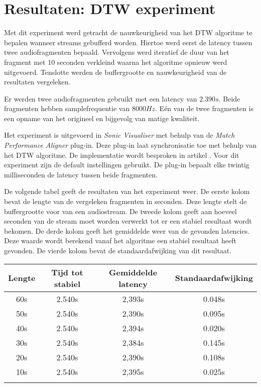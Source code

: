 \chapter{Resultaten: DTW experiment}
\label{appendix-a}

Met dit experiment werd getracht de nauwkeurigheid van het DTW algoritme te bepalen wanneer streams gebufferd worden. Hiertoe werd eerst de latency tussen twee audiofragmenten bepaald. Vervolgens werd iteratief de duur van het fragment met 10 seconden verkleind waarna het algoritme opnieuw werd uitgevoerd. Tenslotte werden de buffergrootte en nauwkeurigheid van de resultaten vergeleken.

Er werden twee audiofragmenten gebruikt met een latency van $2.390s$. Beide fragmenten hebben samplefrequentie van $8000Hz$. Eén van de twee fragmenten is een opname van het origineel en bijgevolg van matige kwaliteit.

Het experiment is uitgevoerd in \textit{Sonic Visualiser} met behulp van de \textit{Match Performance Aligner} plug-in. Deze plug-in laat synchronisatie toe met behulp van het DTW algoritme. De implementatie wordt besproken in artikel \cite{dixon2005match}. Voor dit experiment zijn de default instellingen gebruikt. De plug-in bepaalt elke twintig milliseconden de latency tussen beide fragmenten.

De volgende tabel geeft de resultaten van het experiment weer. De eerste kolom bevat de lengte van de vergeleken fragmenten in seconden. Deze lengte stelt de buffergrootte voor van een audiostream. De tweede kolom geeft aan hoeveel seconden van de stream moet worden verwerkt tot er een stabiel resultaat wordt bekomen. De derde kolom geeft het gemiddelde weer van de gevonden latencies. Deze waarde wordt berekend vanaf het algoritme een stabiel resultaat heeft gevonden. De vierde kolom bevat de standaardafwijking van dit resultaat.\\

\begin{center}
\begin{tabular}{ c  c  c  c }
	\hline
	\textbf{Lengte} & \textbf{Tijd tot stabiel} & \textbf{Gemiddelde latency} & \textbf{Standaardafwijking} \\
	\hline
	60s & 2.540s & 2,393s & 0.048s \\
	50s & 2.540s & 2,390s & 0.095s \\
	40s & 2.540s & 2,394s & 0.020s \\
	30s & 2.540s & 2,384s & 0.145s \\
	20s & 2.540s & 2,390s & 0.108s \\
	10s & 2.540s & 2,395s & 0.025s \\
	\\
\end{tabular}\\
\end{center}

